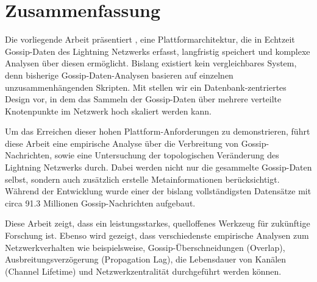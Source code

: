 \section*{Zusammenfassung}

Die vorliegende Arbeit präsentiert , eine Plattformarchitektur,
die in Echtzeit Gossip-Daten des Lightning Netzwerks erfasst, langfristig speichert
und komplexe Analysen über diesen ermöglicht.
Bislang existiert kein vergleichbares System, denn
bisherige Gossip-Daten-Analysen basieren auf einzelnen unzusammenhängenden Skripten.
Mit  stellen wir ein Datenbank-zentriertes Design vor, in dem
das Sammeln der Gossip-Daten über mehrere verteilte Knotenpunkte
im Netzwerk hoch skaliert werden kann.

Um das Erreichen dieser hohen Plattform-Anforderungen zu demonstrieren, 
führt diese Arbeit eine empirische Analyse über die Verbreitung von Gossip-Nachrichten, 
sowie eine Untersuchung der topologischen Veränderung des Lightning Netzwerks durch.
Dabei werden nicht nur die gesammelte Gossip-Daten selbst, sondern auch zusätzlich
erstelle Metainformationen berücksichtigt.
Während der Entwicklung wurde einer der bislang vollständigsten Datensätze 
mit circa \num{91.3} Millionen Gossip-Nachrichten aufgebaut.

Diese Arbeit zeigt, dass  ein leistungsstarkes, 
quelloffenes Werkzeug für zukünftige Forschung ist. 
Ebenso wird gezeigt, dass verschiedenste empirische Analysen zum Netzwerkverhalten 
wie beispielsweise, Gossip-Überschneidungen (Overlap), Ausbreitungsverzögerung (Propagation Lag), 
die Lebensdauer von Kanälen (Channel Lifetime) und Netzwerkzentralität durchgeführt
werden können.

